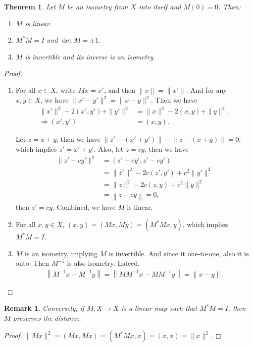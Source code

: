 \documentclass[11pt]{book}
\newtheorem{theorem}{Theorem}[chapter]
\newtheorem{remark}{Remark}[chapter]
\theoremstyle{definition}
\numberwithin{equation}{chapter}
\begin{document}
\begin{theorem}\label{isometry_properties}
Let $M$ be an isometry from $X$ into itself and $M(0) = 0$. Then:
\begin{enumerate}[label=(\alph*)]
    \item $M$ is linear.
    \item $M^* M = I$ and $\det M = \pm 1$.
    \item $M$ is invertible and its inverse is an isometry.
\end{enumerate}
\end{theorem}
\begin{proof}
~\begin{enumerate}[label=(\alph*)]
    \item For all $x\in X$, write $Mx = x'$, and then $\left\|x\right\|= \|x'\|$. And for any $x,y\in X$, we have $\|x' - y'\|^2 = \|x - y\|^2$. Then we have
    \begin{align*}
        \|x'\|^2 - 2(x', y') + \|y'\|^2 & = \|x\|^2 - 2(x, y) + \|y\|^2, \\
        \Rightarrow (x', y') & = (x, y).
    \end{align*}
    
    Let $z = x + y$, then we have $\left\|z'-(x'+y')\right\| - \left\|z-(x+y)\right\| = 0$, which implies $z' = x' + y'$. Also, let $z = cy$, then we have
    \begin{align*}
        \|z' - cy'\|^2 & = (z' - cy', z' - cy') \\
        & = \|z'\|^2 - 2c (z', y') + c^2 \|y'\|^2 \\
        & = \|z\|^2 - 2c (z, y) + c^2 \|y\|^2 \\
        & = \left\|z - cy\right\|= 0,
    \end{align*}
    then $z' = cy$. Combined, we have $M$ is linear.
    \item For all $x,y\in X$, $(x,y) = (Mx, My) = (M^* M x, y)$, which implies $M^* M = I$.
    \item $M$ is an isometry, implying $M$ is invertible. And since it one-to-one, also it is onto. Then $M^{-1}$ is also isometry. Indeed, 
    \begin{align*}
        \left\|M^{-1}x - M^{-1}y\right\| = \left\|M M^{-1}x - M M^{-1}y\right\| = \|x - y\|.
    \end{align*}
\end{enumerate}
\end{proof}

\begin{remark}
Conversely, if $M:X\to X$ is a linear map such that $M^* M = I$, then $M$ preserves the distance.
\end{remark}
\begin{proof}
$\|Mx\|^2 = (Mx, Mx) = (M^* M x, x) = (x, x) = \|x\|^2$.
\end{proof}
\end{document}
